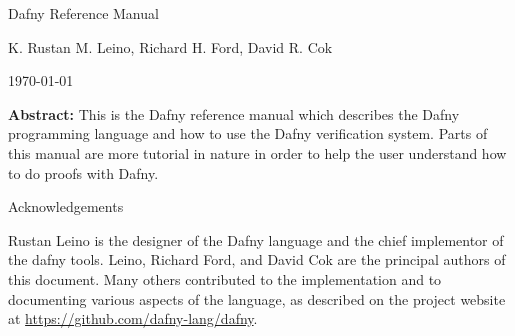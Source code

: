 \begin{center}\Huge Dafny Reference Manual\end{center}
\begin{center}K. Rustan M. Leino, Richard H. Ford, David R. Cok\end{center}
\begin{center}\today\end{center}
\vspace{1in}
\textbf{Abstract:} This is the Dafny reference manual which describes the Dafny programming
language and how to use the Dafny verification system.
Parts of this manual are more tutorial in nature in order to help the
user understand how to do proofs with Dafny.

\vspace{1in}
\begin{center}\Large Acknowledgements\end{center}
Rustan Leino is the designer of the Dafny language and the chief implementor of the dafny tools. Leino, Richard Ford, and David Cok are the principal authors of this document. Many others contributed to the implementation and to documenting various aspects of the language, as described on the project website at \url{https://github.com/dafny-lang/dafny}.
\newpage
